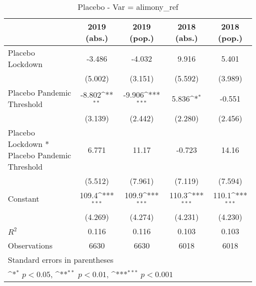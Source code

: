 \documentclass{article}
\begin{document}
{
\def\sym#1{\ifmmode^{#1}\else\(^{#1}\)\fi}
\begin{longtable}{l*{4}{c}}
\caption{Placebo - Var = alimony\_ref}\\
\hline\hline\endfirsthead\hline\endhead\hline\endfoot\endlastfoot
                &\multicolumn{1}{c}{2019 (abs.)}&\multicolumn{1}{c}{2019 (pop.)}&\multicolumn{1}{c}{2018 (abs.)}&\multicolumn{1}{c}{2018 (pop.)}\\
\hline
Placebo Lockdown&   -3.486         &   -4.032         &    9.916         &    5.401         \\
                &  (5.002)         &  (3.151)         &  (5.592)         &  (3.989)         \\
Placebo Pandemic Threshold&   -8.802\sym{**} &   -9.906\sym{***}&    5.836\sym{*}  &   -0.551         \\
                &  (3.139)         &  (2.442)         &  (2.280)         &  (2.456)         \\
Placebo Lockdown * Placebo Pandemic Threshold&    6.771         &    11.17         &   -0.723         &    14.16         \\
                &  (5.512)         &  (7.961)         &  (7.119)         &  (7.594)         \\
Constant        &    109.4\sym{***}&    109.9\sym{***}&    110.3\sym{***}&    110.1\sym{***}\\
                &  (4.269)         &  (4.274)         &  (4.231)         &  (4.230)         \\
\hline
\(R^{2}\)       &    0.116         &    0.116         &    0.103         &    0.103         \\
Observations    &     6630         &     6630         &     6018         &     6018         \\
\hline\hline
\multicolumn{5}{l}{\footnotesize Standard errors in parentheses}\\
\multicolumn{5}{l}{\footnotesize \sym{*} \(p<0.05\), \sym{**} \(p<0.01\), \sym{***} \(p<0.001\)}\\
\end{longtable}
}
\end{document}
